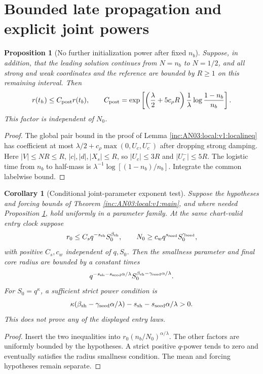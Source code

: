 \documentclass[11pt]{article}
\numberwithin{equation}{section}
\newtheorem{proposition}[theorem]{Proposition}
\newtheorem{corollary}[theorem]{Corollary}
\theoremstyle{remark}\newtheorem{remark}[theorem]{Remark}
\begin{document}
\section{Bounded late propagation and explicit joint powers}
\label{inc:AN03:local:v1:powers}
\begin{proposition}[No further initialization power after fixed $n_b$]
\label{inc:AN03:local:v1:late}
Suppose, in addition, that the leading solution continues from $N=n_b$
to $N=1/2$, and all strong and weak coordinates and the reference are
bounded by $R\ge1$ on this remaining interval. Then
\[
 r(t_h)\le C_{\rm post}r(t_b),\qquad
 C_{\rm post}=\exp\left[
 \left(\frac\lambda2+5c_\rho R\right)
 \frac1\lambda\log\frac{1-n_b}{n_b}\right].
\]
This factor is independent of $N_0$.
\end{proposition}
\begin{proof}
The global pair bound in the proof of Lemma
\ref{inc:AN03:local:v1:localineq} has coefficient at most
$\lambda/2+c_\rho\max(0,U_c,U_c^-)$ after dropping strong damping.
Here $|V|\le NR\le R$, $|c|,|d|,|X_s|\le R$, so $|U_c|\le3R$
and $|U_c^-|\le5R$. The logistic time from $n_b$ to half-mass is
$\lambda^{-1}\log[(1-n_b)/n_b]$. Integrate the common labelwise bound.
\end{proof}

\begin{corollary}[Conditional joint-parameter exponent test]
\label{inc:AN03:local:v1:joint}
Suppose the hypotheses and forcing bounds of Theorem
\ref{inc:AN03:local:v1:main}, and where needed Proposition
\ref{inc:AN03:local:v1:late}, hold uniformly in a parameter family.
At the same chart-valid entry clock suppose
\[
 r_0\le C_s q^{-s_{\rm sh}}S_0^{\beta_{\rm sh}},\qquad
 N_0\ge c_w q^{s_{\rm seed}}S_0^{\gamma_{\rm seed}},
\]
with positive $C_s,c_w$ independent of $q,S_0$. Then the smallness
parameter and final core radius are bounded by a constant times
\begin{equation}\label{inc:AN03:local:v1:qpower}
 q^{-s_{\rm sh}-s_{\rm seed}\alpha/\lambda}
 S_0^{\beta_{\rm sh}-\gamma_{\rm seed}\alpha/\lambda}.
\end{equation}
For $S_0=q^\kappa$, a sufficient strict power condition is
\[
 \kappa(\beta_{\rm sh}-\gamma_{\rm seed}\alpha/\lambda)
 -s_{\rm sh}-s_{\rm seed}\alpha/\lambda>0.
\]
This does not prove any of the displayed entry laws.
\end{corollary}
\begin{proof}
Insert the two inequalities into $r_0(n_b/N_0)^{\alpha/\lambda}$.
The other factors are uniformly bounded by the hypotheses. A strict
positive $q$-power tends to zero and eventually satisfies the radius
smallness condition. The mean and forcing hypotheses remain separate.
\end{proof}
\end{document}
